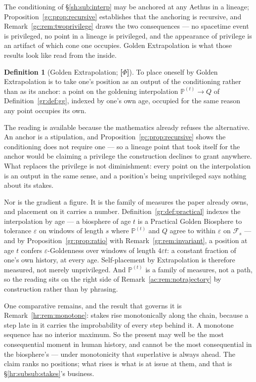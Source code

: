 \documentclass[11pt]{article}
\numberwithin{equation}{section}
\theoremstyle{plain}
\theoremstyle{definition}
\newtheorem{definition}[theorem]{Definition}
\theoremstyle{remark}
\newcommand{\PP}{\mathbb{P}}
\begin{document}
The conditioning of \S\ref{sh:sub:interp} may be anchored at any Aethus in a lineage; Proposition~\ref{gc:prop:recursive} establishes that the anchoring is recursive, and Remark~\ref{gc:rem:twoprivilege} draws the two consequences --- no spacetime event is privileged, no point in a lineage is privileged, and the appearance of privilege is an artifact of which cone one occupies. Golden Extrapolation is what those results look like read from the inside.

\begin{definition}[Golden Extrapolation; \textbf{[$\Phi$]}]\label{ac:def:extrapolation}
To place oneself by Golden Extrapolation is to take one's position as an output of the conditioning rather than as its anchor: a point on the goldening interpolation $\PP^{(t)} \to Q$ of Definition~\ref{gr:def:gg}, indexed by one's own age, occupied for the same reason any point occupies its own.
\end{definition}

The reading is available because the mathematics already refuses the alternative. An anchor is a stipulation, and Proposition~\ref{gc:prop:recursive} shows the conditioning does not require one --- so a lineage point that took itself for the anchor would be claiming a privilege the construction declines to grant anywhere. What replaces the privilege is not diminishment: every point on the interpolation is an output in the same sense, and a position's being unprivileged says nothing about its stakes.

Nor is the gradient a figure. It is the family of measures the paper already owns, and placement on it carries a number. Definition~\ref{gr:def:practical} indexes the interpolation by age --- a biosphere of age $t$ is a Practical Golden Biosphere to tolerance $\varepsilon$ on windows of length $s$ where $\PP^{(t)}$ and $Q$ agree to within $\varepsilon$ on $\mathcal{F}_s$ --- and by Proposition~\ref{gr:prop:ratio} with Remark~\ref{gr:rem:invariant}, a position at age $t$ confers $\varepsilon$-Goldenness over windows of length $4\varepsilon t$: a constant fraction of one's own history, at every age. Self-placement by Extrapolation is therefore measured, not merely unprivileged. And $\PP^{(t)}$ is a family of measures, not a path, so the reading sits on the right side of Remark~\ref{ac:rem:notrajectory} by construction rather than by phrasing.

One comparative remains, and the result that governs it is Remark~\ref{hr:rem:monotone}: stakes rise monotonically along the chain, because a step late in it carries the improbability of every step behind it. A monotone sequence has no interior maximum. So the present may well be the most consequential moment in human history, and cannot be the most consequential in the biosphere's --- under monotonicity that superlative is always ahead. The claim ranks no positions; what rises is what is at issue at them, and that is \S\ref{hr:subsub:stakes}'s business.
\end{document}
